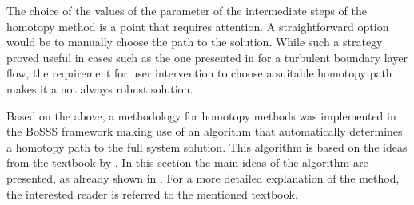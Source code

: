 The choice of the values of the parameter of the intermediate steps of the homotopy method is a point that requires attention. A straightforward option would be to manually choose the path to the solution. While such a strategy proved useful in cases such as the one presented in \parencite{klingenbergdarioDevelopmentNovelReynoldsaveraged2022} for a turbulent boundary layer flow, the requirement for user intervention to choose a suitable homotopy path makes it a not always robust solution. 

Based on the above, a methodology for homotopy methods was implemented in the BoSSS framework making use of an algorithm that automatically determines a homotopy path to the full system solution. This algorithm is based on the ideas from the textbook by  \textcite{deuflhardNewtonMethodsNonlinear2011}. In this section the main ideas of the algorithm are presented, as already shown in \parencite{gutierrez-jorqueraFullyCoupledHigh2022}. For a more detailed explanation of the method, the interested reader is referred to the mentioned textbook.


